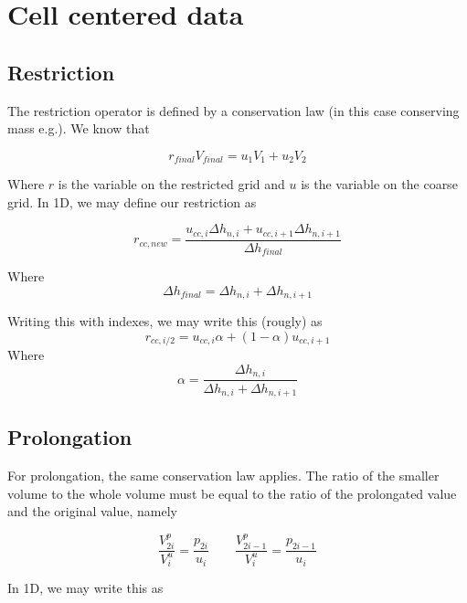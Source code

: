 \documentclass[11pt]{article}
\begin{document}
\section{Cell centered data}

\subsection{Restriction}
The restriction operator is defined by a conservation law (in this case conserving mass e.g.). We know that

\begin{equation}
	r_{final} V_{final} = u_1 V_1 + u_2 V_2
\end{equation}

Where $r$ is the variable on the restricted grid and $u$ is the variable on the coarse grid.
In 1D, we may define our restriction as

\begin{equation}
	r_{cc,new} = \frac{u_{cc,i} \Delta h_{n,i} +u_{cc,i+1} \Delta h_{n,i+1} }{\Delta h_{final}}
\end{equation}

Where
\begin{equation}
	\Delta h_{final} = \Delta h_{n,i} + \Delta h_{n,i+1}
\end{equation}

Writing this with indexes, we may write this (rougly) as
\begin{equation}
	r_{cc,i/2} = u_{cc,i} \alpha + (1-\alpha)u_{cc,i+1}
\end{equation}
Where
\begin{equation}
	\alpha = \frac{\Delta h_{n,i}}{\Delta h_{n,i}+\Delta h_{n,i+1}}
\end{equation}

\subsection{Prolongation}

For prolongation, the same conservation law applies. The ratio of the smaller volume to the whole volume must be equal to the ratio of the prolongated value and the original value, namely

\begin{equation}
	\frac{V_{2i}^{p}}{V_{i}^{u}} = \frac{p_{2i}}{u_{i}} \qquad 
	\frac{V_{2i-1}^{p}}{V_{i}^{u}} = \frac{p_{2i-1}}{u_{i}}
\end{equation}

In 1D, we may write this as
\end{document}
